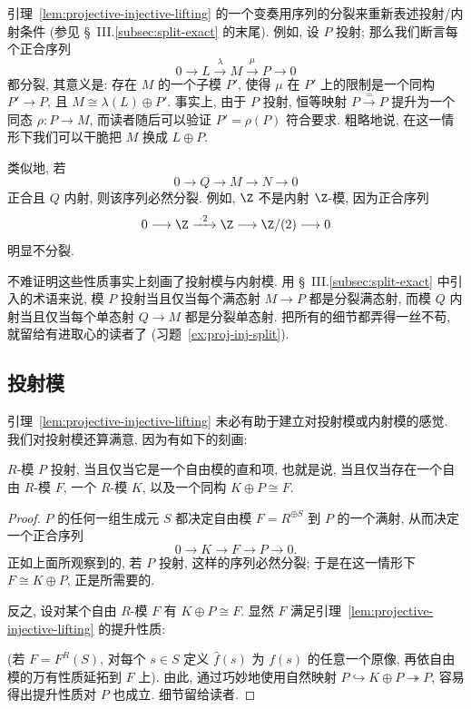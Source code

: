 引理~\ref{lem:projective-injective-lifting} 的一个变奏用序列的分裂来重新表述投射/内射条件 (参见 \S~III.\ref{subsec:split-exact} 的末尾). 例如, 设 $P$ 投射; 那么我们断言每个正合序列
\[
0\longrightarrow L\xrightarrow{\ \lambda\ }M\xrightarrow{\ \mu\ }P\longrightarrow 0
\]
都分裂, 其意义是: 存在 $M$ 的一个子模 $P'$, 使得 $\mu$ 在 $P'$ 上的限制是一个同构 $P'\to P$, 且 $M\cong\lambda(L)\oplus P'$. 事实上, 由于 $P$ 投射, 恒等映射 $P\xrightarrow{=}P$ 提升为一个同态 $\rho:P\to M$, 而读者随后可以验证 $P'=\rho(P)$ 符合要求. 粗略地说, 在这一情形下我们可以干脆把 $M$ 换成 $L\oplus P$.

类似地, 若
\[
0\longrightarrow Q\longrightarrow M\longrightarrow N\longrightarrow 0
\]
正合且 $Q$ 内射, 则该序列必然分裂. 例如, $\Z$ 不是内射 $\Z$-模, 因为正合序列
\[
0\longrightarrow\Z\xrightarrow{\ \cdot 2\ }\Z\longrightarrow\Z/(2)\longrightarrow 0
\]
明显不分裂.

不难证明这些性质事实上刻画了投射模与内射模. 用 \S~III.\ref{subsec:split-exact} 中引入的术语来说, 模 $P$ 投射当且仅当每个满态射 $M\to P$ 都是分裂满态射, 而模 $Q$ 内射当且仅当每个单态射 $Q\to M$ 都是分裂单态射. 把所有的细节都弄得一丝不苟, 就留给有进取心的读者了 (习题~\ref{ex:proj-inj-split}).

\subsection{投射模}\label{subsec:projective-modules}

引理~\ref{lem:projective-injective-lifting} 未必有助于建立对投射模或内射模的感觉. 我们对投射模还算满意, 因为有如下的刻画:

\begin{proposition}\label{prop:projective-summand-free}
$R$-模 $P$ 投射, 当且仅当它是一个自由模的直和项, 也就是说, 当且仅当存在一个自由 $R$-模 $F$, 一个 $R$-模 $K$, 以及一个同构 $K\oplus P\cong F$.
\end{proposition}

\begin{proof}
$P$ 的任何一组生成元 $S$ 都决定自由模 $F=R^{\oplus S}$ 到 $P$ 的一个满射, 从而决定一个正合序列
\[
0\longrightarrow K\longrightarrow F\longrightarrow P\longrightarrow 0.
\]
正如上面所观察到的, 若 $P$ 投射, 这样的序列必然分裂; 于是在这一情形下 $F\cong K\oplus P$, 正是所需要的.

反之, 设对某个自由 $R$-模 $F$ 有 $K\oplus P\cong F$. 显然 $F$ 满足引理~\ref{lem:projective-injective-lifting} 的提升性质:
\begin{center}
\end{center}
(若 $F=F^R(S)$, 对每个 $s\in S$ 定义 $\hat{f}(s)$ 为 $f(s)$ 的任意一个原像, 再依自由模的万有性质延拓到 $F$ 上). 由此, 通过巧妙地使用自然映射 $P\hookrightarrow K\oplus P\twoheadrightarrow P$, 容易得出提升性质对 $P$ 也成立. 细节留给读者.
\end{proof}

